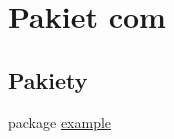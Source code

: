 \hypertarget{namespacecom}{\section{Pakiet com}
\label{namespacecom}
}
\subsection*{Pakiety}
\begin{DoxyCompactItemize}
\item 
package \hyperlink{namespacecom_1_1example}{example}
\end{DoxyCompactItemize}
